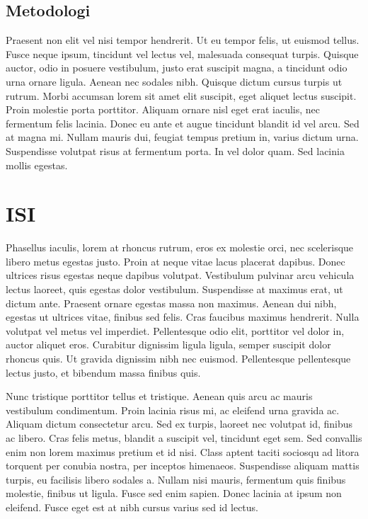 \documentclass[a4paper,12pt]{article}
\begin{document}
\subsection{Metodologi}
Praesent non elit vel nisi tempor hendrerit. Ut eu tempor felis, ut euismod tellus. Fusce neque ipsum, tincidunt vel lectus vel, malesuada consequat turpis. Quisque auctor, odio in posuere vestibulum, justo erat suscipit magna, a tincidunt odio urna ornare ligula. Aenean nec sodales nibh. Quisque dictum cursus turpis ut rutrum. Morbi accumsan lorem sit amet elit suscipit, eget aliquet lectus suscipit. Proin molestie porta porttitor. Aliquam ornare nisl eget erat iaculis, nec fermentum felis lacinia. Donec eu ante et augue tincidunt blandit id vel arcu. Sed at magna mi. Nullam mauris dui, feugiat tempus pretium in, varius dictum urna. Suspendisse volutpat risus at fermentum porta. In vel dolor quam. Sed lacinia mollis egestas.
\pagebreak
\section{\textbf{ISI}}
Phasellus iaculis, lorem at rhoncus rutrum, eros ex molestie orci, nec scelerisque libero metus egestas justo. Proin at neque vitae lacus placerat dapibus. Donec ultrices risus egestas neque dapibus volutpat. Vestibulum pulvinar arcu vehicula lectus laoreet, quis egestas dolor vestibulum. Suspendisse at maximus erat, ut dictum ante. Praesent ornare egestas massa non maximus. Aenean dui nibh, egestas ut ultrices vitae, finibus sed felis. Cras faucibus maximus hendrerit. Nulla volutpat vel metus vel imperdiet. Pellentesque odio elit, porttitor vel dolor in, auctor aliquet eros. Curabitur dignissim ligula ligula, semper suscipit dolor rhoncus quis. Ut gravida dignissim nibh nec euismod. Pellentesque pellentesque lectus justo, et bibendum massa finibus quis.

Nunc tristique porttitor tellus et tristique. Aenean quis arcu ac mauris vestibulum condimentum. Proin lacinia risus mi, ac eleifend urna gravida ac. Aliquam dictum consectetur arcu. Sed ex turpis, laoreet nec volutpat id, finibus ac libero. Cras felis metus, blandit a suscipit vel, tincidunt eget sem. Sed convallis enim non lorem maximus pretium et id nisi. Class aptent taciti sociosqu ad litora torquent per conubia nostra, per inceptos himenaeos. Suspendisse aliquam mattis turpis, eu facilisis libero sodales a. Nullam nisi mauris, fermentum quis finibus molestie, finibus ut ligula. Fusce sed enim sapien. Donec lacinia at ipsum non eleifend. Fusce eget est at nibh cursus varius sed id lectus.
\end{document}
